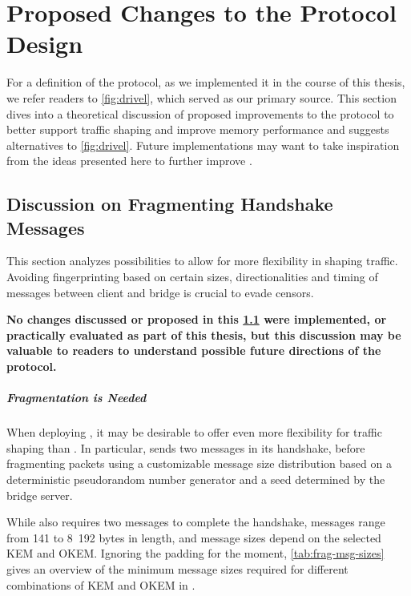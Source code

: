 \chapter{Proposed Changes to the Protocol Design}\label{ch:protocol-changes}

For a definition of the \drivel{} protocol, as we implemented it in the course of this thesis, we refer readers to \cref{fig:drivel}, which served as our primary source.
This section dives into a theoretical discussion of proposed improvements to the protocol to better support traffic shaping and improve memory performance and suggests alternatives to \cref{fig:drivel}.
Future implementations may want to take inspiration from the ideas presented here to further improve \drivel{}.

\section{Discussion on Fragmenting Handshake Messages} \label{ssec:fragmentation}

This section analyzes possibilities to allow for more flexibility in shaping \drivel{} traffic. Avoiding fingerprinting based on certain sizes, directionalities and timing of messages between client and bridge is crucial to evade censors.

\textbf{No changes discussed or proposed in this \cref{ssec:fragmentation} were implemented, or practically evaluated as part of this thesis, but this discussion may be valuable to readers to understand possible future directions of the protocol.}

\paragraph{Fragmentation is Needed}
When deploying \drivel{}, it may be desirable to offer even more flexibility for traffic shaping than \obfsfour{}. In particular, \obfsfour{} sends two messages in its handshake, before fragmenting packets using a customizable message size distribution based on a deterministic pseudorandom number generator and a seed determined by the bridge server.

While \drivel{} also requires two messages to complete the handshake, \obfsfour{} messages range from 141 to 8~192 bytes in length, and \drivel{} message sizes depend on the selected KEM and OKEM. Ignoring the padding for the moment, \cref{tab:frag-msg-sizes} gives an overview of the minimum message sizes required for different combinations of KEM and OKEM in \drivel{}.

